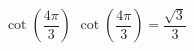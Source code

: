 {$\cot \left( \dfrac{4\pi}{3} \right)$}
{$\cot \left( \dfrac{4\pi}{3} \right) = \dfrac{\sqrt{3}}{3}$}
